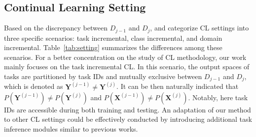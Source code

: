 

\subsection{Continual Learning Setting}
Based on the discrepancy between $D_{j-1}$ and $D_{j}$, \cite{hsu2018re} and \cite{van2019three} categorize CL settings into three specific scenarios: task incremental, class incremental, and domain incremental. Table~\ref{tab:setting} summarizes the differences among these scenarios. For a better concentration on the study of CL methodology, our work mainly focuses on the task incremental CL. In this scenario, the output spaces of tasks are partitioned by task IDs and mutually exclusive between $D_{j-1}$ and $D_{j}$, which is denoted as $\mathbf{Y}^{(j-1)}\neq\mathbf{Y}^{(j)}$. It can be then naturally indicated that $P(\mathbf{Y}^{(j-1)})\neq P(\mathbf{Y}^{(j)})$ and $P(\mathbf{X}^{(j-1)})\neq P(\mathbf{X}^{(j)})$. Notably, here task IDs are accessible during both training and testing. An adaptation of our method to other CL settings could be effectively conducted by introducing additional task inference modules similar to previous works.

\begin{table*}[htb]
\setlength{\tabcolsep}{4pt}
    \renewcommand{\arraystretch}{1.2}
    \centering
    \caption{\textbf{Categorization of CL settings based on the discrepancy between $D_{j-1}$ and $D_{j}$.}`*’ denotes the scenario focused on in our work.}
    \label{tab:setting}
\end{table*}

